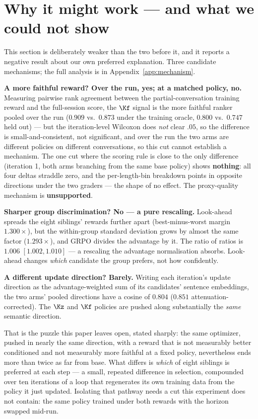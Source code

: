 \section{Why it might work --- and what we could not show}
\label{sec:mechanism}

This section is deliberately weaker than the two before it, and it reports a negative result
about our own preferred explanation. Three candidate mechanisms; the full analysis is in
Appendix~\ref{app:mechanism}.

\textbf{A more faithful reward? Over the run, yes; at a matched policy, no.} Measuring pairwise
rank agreement between the partial-conversation training reward and the full-session score, the
$\Kf$ signal is the more faithful ranker pooled over the run ($0.909$ vs.\ $0.873$ under the
training oracle, $0.800$ vs.\ $0.747$ held out) --- but the iteration-level Wilcoxon does
\emph{not} clear $.05$, so the difference is small-and-consistent, not significant, and over the
run the two arms are different policies on different conversations, so this cut cannot establish a
mechanism. The one cut where the scoring rule is close to the only difference (iteration 1, both
arms branching from the same base policy) shows \textbf{nothing}: all four deltas straddle zero,
and the per-length-bin breakdown points in opposite directions under the two graders --- the shape
of no effect. The proxy-quality mechanism is \textbf{unsupported}.

\textbf{Sharper group discrimination? No --- a pure rescaling.} Look-ahead spreads the eight
siblings' rewards further apart (best-minus-worst margin $1.300\times$), but the within-group
standard deviation grows by almost the same factor ($1.293\times$), and GRPO divides the advantage
by it. The ratio of ratios is $1.006$ $[1.002, 1.010]$ --- a rescaling the advantage normalisation
absorbs. Look-ahead changes \emph{which} candidate the group prefers, not how confidently.

\textbf{A different update direction? Barely.} Writing each iteration's update direction as the
advantage-weighted sum of its candidates' sentence embeddings, the two arms' pooled directions
have a cosine of $0.804$ ($0.851$ attenuation-corrected). The $\Kz$ and $\Kf$ policies are pushed
along substantially the \emph{same} semantic direction.

That is the puzzle this paper leaves open, stated sharply: the same optimizer, pushed in nearly the
same direction, with a reward that is not measurably better conditioned and not measurably more
faithful at a fixed policy, nevertheless ends more than twice as far from base. What differs is
\emph{which} of eight siblings is preferred at each step --- a small, repeated difference in
selection, compounded over ten iterations of a loop that regenerates its own training data from
the policy it just updated. Isolating that pathway needs a cut this experiment does not contain:
the same policy trained under both rewards with the horizon swapped mid-run.
